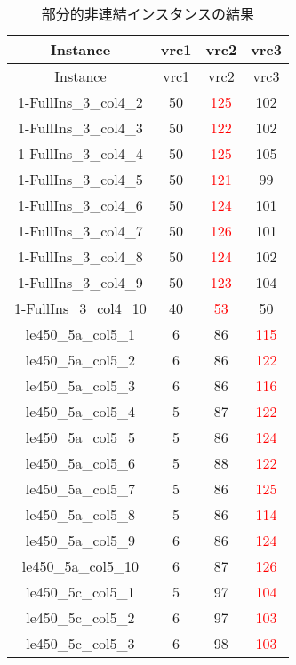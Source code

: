 \begin{longtable}{|c|c|c|c|}
  \caption{部分的非連結インスタンスの結果}
  \label{tab:result_unknown}
  \hline
    Instance & vrc1 & vrc2 & vrc3 \\ \hline
  \endfirsthead
  \hline
  Instance & vrc1 & vrc2 & vrc3 \\ \hline
  \endhead
  1-FullIns\_3\_col4\_2 & 50 & \textcolor{red}{125} & 102 \\ \hline
  1-FullIns\_3\_col4\_3 & 50 & \textcolor{red}{122} & 102 \\ \hline
  1-FullIns\_3\_col4\_4 & 50 & \textcolor{red}{125} & 105 \\ \hline
  1-FullIns\_3\_col4\_5 & 50 & \textcolor{red}{121} & 99 \\ \hline
  1-FullIns\_3\_col4\_6 & 50 & \textcolor{red}{124} & 101 \\ \hline
  1-FullIns\_3\_col4\_7 & 50 & \textcolor{red}{126} & 101 \\ \hline
  1-FullIns\_3\_col4\_8 & 50 & \textcolor{red}{124} & 102 \\ \hline
  1-FullIns\_3\_col4\_9 & 50 & \textcolor{red}{123} & 104 \\ \hline
  1-FullIns\_3\_col4\_10 & 40 & \textcolor{red}{53} & 50 \\ \hline
  le450\_5a\_col5\_1 & 6 & 86 & \textcolor{red}{115} \\ \hline
  le450\_5a\_col5\_2 & 6 & 86 & \textcolor{red}{122} \\ \hline
  le450\_5a\_col5\_3 & 6 & 86 & \textcolor{red}{116} \\ \hline
  le450\_5a\_col5\_4 & 5 & 87 & \textcolor{red}{122} \\ \hline
  le450\_5a\_col5\_5 & 5 & 86 & \textcolor{red}{124} \\ \hline
  le450\_5a\_col5\_6 & 5 & 88 & \textcolor{red}{122} \\ \hline
  le450\_5a\_col5\_7 & 5 & 86 & \textcolor{red}{125} \\ \hline
  le450\_5a\_col5\_8 & 5 & 86 & \textcolor{red}{114} \\ \hline
  le450\_5a\_col5\_9 & 6 & 86 & \textcolor{red}{124} \\ \hline
  le450\_5a\_col5\_10 & 6 & 87 & \textcolor{red}{126} \\ \hline
  le450\_5c\_col5\_1 & 5 & 97 & \textcolor{red}{104} \\ \hline
  le450\_5c\_col5\_2 & 6 & 97 & \textcolor{red}{103} \\ \hline
  le450\_5c\_col5\_3 & 6 & 98 & \textcolor{red}{103} \\ \hline

\end{longtable}
